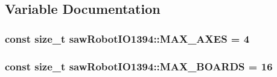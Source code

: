 \subsection{Variable Documentation}
\hypertarget{namespacesaw_robot_i_o1394_a397b95aa9a72ba9aaf6cf10c9ef6a37a}{
\subsubsection[{M\-A\-X\-\_\-\-A\-X\-E\-S}]{\setlength{\rightskip}{0pt plus 5cm}const size\-\_\-t saw\-Robot\-I\-O1394\-::\-M\-A\-X\-\_\-\-A\-X\-E\-S = 4}}\label{namespacesaw_robot_i_o1394_a397b95aa9a72ba9aaf6cf10c9ef6a37a}
\hypertarget{namespacesaw_robot_i_o1394_a2ea4cc88435b1ca85b6c633ba6360af4}{
\subsubsection[{M\-A\-X\-\_\-\-B\-O\-A\-R\-D\-S}]{\setlength{\rightskip}{0pt plus 5cm}const size\-\_\-t saw\-Robot\-I\-O1394\-::\-M\-A\-X\-\_\-\-B\-O\-A\-R\-D\-S = 16}}\label{namespacesaw_robot_i_o1394_a2ea4cc88435b1ca85b6c633ba6360af4}
